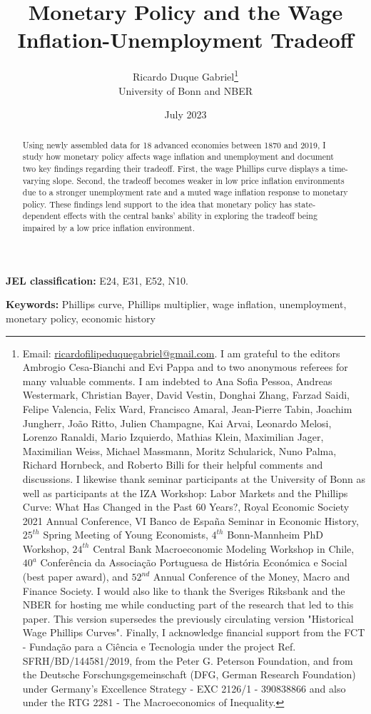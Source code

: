 \documentclass[12pt]{article}
\title{\textbf{Monetary Policy and the Wage Inflation-Unemployment Tradeoff}}
\author{Ricardo Duque Gabriel\footnote{\scriptsize Email: \href{mailto:ricardofilipeduquegabriel@gmail.com}{ricardofilipeduquegabriel@gmail.com}. I am grateful to the editors Ambrogio Cesa-Bianchi and Evi Pappa and to two anonymous referees for many valuable comments. I am indebted to Ana Sofia Pessoa, Andreas Westermark, Christian Bayer, David Vestin, Donghai Zhang, Farzad Saidi, Felipe Valencia, Felix Ward, Francisco Amaral, Jean-Pierre Tabin, Joachim Jungherr, João Ritto, Julien Champagne, Kai Arvai, Leonardo Melosi, Lorenzo Ranaldi, Mario Izquierdo, Mathias Klein, Maximilian Jager, Maximilian Weiss, Michael Massmann, Moritz Schularick, Nuno Palma, Richard Hornbeck, and Roberto Billi for their helpful comments and discussions. I likewise thank seminar participants at the University of Bonn as well as participants at the IZA Workshop: Labor Markets and the Phillips Curve: What Has Changed in the Past 60 Years?, Royal Economic Society 2021 Annual Conference, VI Banco de España Seminar in Economic History, $25^{th}$ Spring Meeting of Young Economists, $4^{th}$ Bonn-Mannheim PhD Workshop, $24^{th}$ Central Bank Macroeconomic Modeling Workshop in Chile, $40^a$ Conferência da Associação Portuguesa de História Económica e Social (best paper award), and $52^{nd}$ Annual Conference of the Money, Macro and Finance Society. I would also like to thank the Sveriges Riksbank and the NBER for hosting me while conducting part of the research that led to this paper. This version supersedes the previously circulating version "Historical Wage Phillips Curves". Finally, I acknowledge financial support from the FCT - Fundação para a Ciência e Tecnologia under the project Ref. SFRH/BD/144581/2019, from the Peter G. Peterson Foundation, and from the Deutsche Forschungsgemeinschaft (DFG, German Research Foundation) under Germany's Excellence Strategy - EXC 2126/1 - 390838866 and also under the RTG 2281 - The Macroeconomics of Inequality.}\\ University of Bonn and NBER}
\date{July 2023}
\begin{document}
\begin{titlepage}

\thispagestyle{empty} 
\maketitle

\begin{abstract}
\normalsize Using newly assembled data for 18 advanced economies between 1870 and 2019, I study how monetary policy affects wage inflation and unemployment and document two key findings regarding their tradeoff. First, the wage Phillips curve displays a time-varying slope. Second, the tradeoff becomes weaker in low price inflation environments due to a stronger unemployment rate and a muted wage inflation response to monetary policy. These findings lend support to the idea that monetary policy has state-dependent effects with the central banks' ability in exploring the tradeoff being impaired by a low price inflation environment.


\end{abstract}

\vspace{1em}

\textbf{JEL classification:} E24, E31, E52, N10. 

\vspace{1em}

\textbf{Keywords:} Phillips curve, Phillips multiplier, wage inflation, unemployment, monetary policy, economic history 

\end{titlepage}
\end{document}
